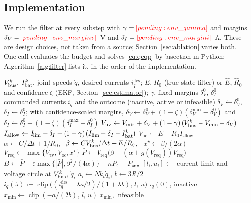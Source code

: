 \subsection{Implementation}
We run the filter at every substep with $\gamma=\res{env_gamma}$ and margins $\delta_V=\res{env_marginv}$~V and $\delta_I=\res{env_margini}$~A. These are design choices, not taken from a source; Section~\ref{sec:ablation} varies both. One call evaluates the budget and solves \eqref{eq:qcqp} by bisection in Python; Algorithm~\ref{alg:filter} lists it, in the order of the implementation.
\begin{algorithm}[tbp]
\caption{Barrier power filter, one plant substep $k$}\label{alg:filter}
\begin{algorithmic}[1]
\Require $V_{\mathrm{bus}}^k$, $I_{\mathrm{bat}}^k$, joint speeds $\dot q$, desired currents $i_q^{\mathrm{des}}$; $E$, $R_0$ (true-state filter) or $\hat E$, $\hat R_0$ and confidence $\zeta$ (EKF, Section~\ref{sec:estimator}); $\gamma$, fixed margins $\delta_V^0$, $\delta_I^0$
\Ensure commanded currents $i_q$ and the outcome (inactive, active or infeasible)
\State $\delta_V\gets\delta_V^0$, $\delta_I\gets\delta_I^0$; with confidence-scaled margins, $\delta_V\gets\delta_V^0+(1-\zeta)(\delta_V^{\max}-\delta_V^0)$ and $\delta_I\gets\delta_I^0+(1-\zeta)(\delta_I^{\max}-\delta_I^0)$ \Comment{\eqref{eq:confmargin}}
\State $V_{\mathrm{uv}}\gets V_{\min}+\delta_V+(1-\gamma)\,(V_{\mathrm{bus}}^k-V_{\min}-\delta_V)$ 
\State $I_{\mathrm{allow}}\gets I_{\lim}-\delta_I-(1-\gamma)\,(I_{\lim}-\delta_I-I_{\mathrm{bat}}^k)$ 
\State $V_{\mathrm{oc}}\gets E-R_0 I_{\mathrm{allow}}$
\State $\alpha\gets C/\Delta t+1/R_0$, \ $\beta\gets CV_{\mathrm{bus}}^k/\Delta t+E/R_0$, \ $x^\star\gets\beta/(2\alpha)$ \Comment{\eqref{eq:budgetstep}}
\State $V_{\mathrm{req}}\gets\max\{V_{\mathrm{uv}},V_{\mathrm{oc}},x^\star\}$ 
\State $\bar P\gets V_{\mathrm{req}}\bigl(\beta-(\alpha+g(V_{\mathrm{req}}))V_{\mathrm{req}}\bigr)$
\State $B\gets\bar P-\varepsilon\max\{|\bar P|,\beta^2/(4\alpha)\}-nP_0-P_{\mathrm{aux}}$ 
\State $[l_i,u_i]\gets$ current limit and voltage circle at $V_{\mathrm{bus}}^k$, $\dot q_i$ 
\State $a_i\gets Nk_t\dot q_i$, $b\gets 3R/2$ \Comment{\eqref{eq:power}}
\State $i_q(\lambda):=\operatorname{clip}\bigl((i_q^{\mathrm{des}}-\lambda a/2)/(1+\lambda b),\,l,\,u\bigr)$ \Comment{\eqref{eq:clipped}}
 \Return $i_q(0)$, inactive \EndIf
\State $x_{\min}\gets\operatorname{clip}(-a/(2b),\,l,\,u)$
 \Return $x_{\min}$, infeasible \EndIf

\end{algorithmic}
\end{algorithm}
